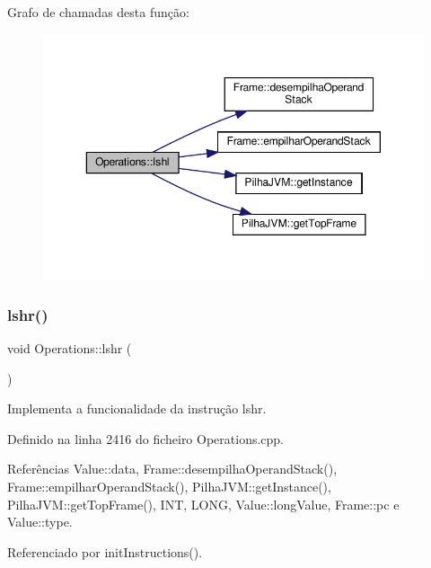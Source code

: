 Grafo de chamadas desta função\+:\nopagebreak
\begin{figure}[H]
\begin{center}
\leavevmode
\includegraphics[width=350pt]{classOperations_a9d2b2a5ea74f26e6a5005ec9e99b24d9_cgraph}
\end{center}
\end{figure}
\mbox{\label{classOperations_aa886b0d027fb5b030016af6100541e81}} 
\subsubsection{\texorpdfstring{lshr()}{lshr()}}
{\footnotesize\ttfamily void Operations\+::lshr (\begin{DoxyParamCaption}{ }\end{DoxyParamCaption})\hspace{0.3cm}{\ttfamily [private]}}



Implementa a funcionalidade da instrução lshr. 



Definido na linha 2416 do ficheiro Operations.\+cpp.



Referências Value\+::data, Frame\+::desempilha\+Operand\+Stack(), Frame\+::empilhar\+Operand\+Stack(), Pilha\+J\+V\+M\+::get\+Instance(), Pilha\+J\+V\+M\+::get\+Top\+Frame(), I\+NT, L\+O\+NG, Value\+::long\+Value, Frame\+::pc e Value\+::type.



Referenciado por init\+Instructions().

